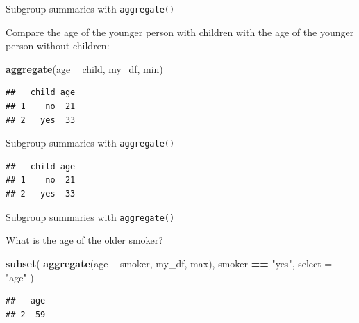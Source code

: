 \documentclass[ignorenonframetext,]{beamer}
\newenvironment{Shaded}{\begin{snugshade}}{\end{snugshade}}
\newcommand{\DataTypeTok}[1]{\textcolor[rgb]{0.13,0.29,0.53}{#1}}
\newcommand{\KeywordTok}[1]{\textcolor[rgb]{0.13,0.29,0.53}{\textbf{#1}}}
\newcommand{\NormalTok}[1]{#1}
\newcommand{\OperatorTok}[1]{\textcolor[rgb]{0.81,0.36,0.00}{\textbf{#1}}}
\newcommand{\StringTok}[1]{\textcolor[rgb]{0.31,0.60,0.02}{#1}}
\begin{document}
\begin{frame}[fragile]{Subgroup summaries with \texttt{aggregate()}}
\protect\hypertarget{subgroup-summaries-with-aggregate-15}{}

Compare the age of the younger person with children with the age of the
younger person without children:

\begin{Shaded}
\begin{Highlighting}[]
\KeywordTok{aggregate}\NormalTok{(age }\OperatorTok{~}\StringTok{ }\NormalTok{child, my_df, min)}
\end{Highlighting}
\end{Shaded}

\begin{verbatim}
##   child age
## 1    no  21
## 2   yes  33
\end{verbatim}

\end{frame}

\begin{frame}[fragile]{Subgroup summaries with \texttt{aggregate()}}
\protect\hypertarget{subgroup-summaries-with-aggregate-16}{}

\begin{Shaded}
\end{Shaded}

\begin{verbatim}
##   child age
## 1    no  21
## 2   yes  33
\end{verbatim}

\end{frame}

\begin{frame}[fragile]{Subgroup summaries with \texttt{aggregate()}}
\protect\hypertarget{subgroup-summaries-with-aggregate-17}{}

What is the age of the older smoker?

\begin{Shaded}
\begin{Highlighting}[]
\KeywordTok{subset}\NormalTok{(}
  \KeywordTok{aggregate}\NormalTok{(age }\OperatorTok{~}\StringTok{ }\NormalTok{smoker, my_df, max),}
\NormalTok{  smoker }\OperatorTok{==}\StringTok{ "yes"}\NormalTok{, }
  \DataTypeTok{select =} \StringTok{"age"}
\NormalTok{  )}
\end{Highlighting}
\end{Shaded}

\begin{verbatim}
##   age
## 2  59
\end{verbatim}

\end{frame}
\end{document}
